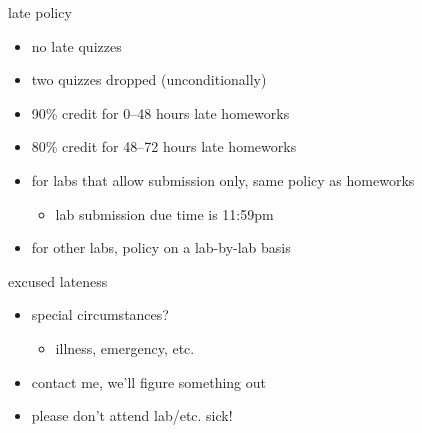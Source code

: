 
\begin{frame}{late policy}
    \begin{itemize}
    \item no late quizzes
    \item two quizzes dropped (unconditionally)
    \vspace{.5cm}
    \item 90\% credit for 0--48 hours late homeworks
    \item 80\% credit for 48--72 hours late homeworks
    \vspace{.5cm}
    \item for labs that allow submission only, same policy as homeworks
        \begin{itemize}
        \item lab submission due time is 11:59pm
        \end{itemize}
    \item for other labs, policy on a lab-by-lab basis
    \end{itemize}
\end{frame}


\begin{frame}{excused lateness}
    \begin{itemize}
    \item special circumstances?
        \begin{itemize}
        \item illness, emergency, etc.
        \end{itemize}
    \item contact me, we'll figure something out
    \vspace{.5cm}
    \item please don't attend lab/etc. sick!
    \end{itemize}
\end{frame}
